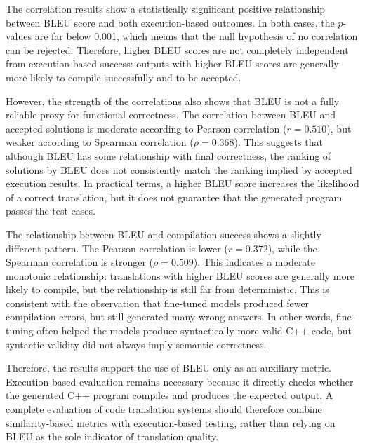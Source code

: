 The correlation results show a statistically significant positive relationship
between BLEU score and both execution-based outcomes. In both cases, the
$p$-values are far below 0.001, which means that the null hypothesis of no
correlation can be rejected. Therefore, higher BLEU scores are not completely
independent from execution-based success: outputs with higher BLEU scores are
generally more likely to compile successfully and to be accepted.

However, the strength of the correlations also shows that BLEU is not a fully
reliable proxy for functional correctness. The correlation between BLEU and
accepted solutions is moderate according to Pearson correlation ($r = 0.510$),
but weaker according to Spearman correlation ($\rho = 0.368$). This suggests that
although BLEU has some relationship with final correctness, the ranking of
solutions by BLEU does not consistently match the ranking implied by accepted
execution results. In practical terms, a higher BLEU score increases the
likelihood of a correct translation, but it does not guarantee that the generated
program passes the test cases.

The relationship between BLEU and compilation success shows a slightly different
pattern. The Pearson correlation is lower ($r = 0.372$), while the Spearman
correlation is stronger ($\rho = 0.509$). This indicates a moderate monotonic
relationship: translations with higher BLEU scores are generally more likely to
compile, but the relationship is still far from deterministic. This is consistent
with the observation that fine-tuned models produced fewer compilation errors,
but still generated many wrong answers. In other words, fine-tuning often helped
the models produce syntactically more valid C++ code, but syntactic validity did
not always imply semantic correctness.

Therefore, the results support the use of BLEU only as an auxiliary metric.
Execution-based evaluation remains necessary because it directly checks whether
the generated C++ program compiles and produces the expected output. A complete
evaluation of code translation systems should therefore combine similarity-based
metrics with execution-based testing, rather than relying on BLEU as the sole
indicator of translation quality.

